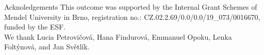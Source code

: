 \documentclass[final]{beamer}
\newlength{\sepwidth}
\newlength{\colwidth}
\newcommand{\separatorcolumn}{\begin{column}{\sepwidth}\end{column}}
\begin{document}
\begin{frame}[t]
\begin{columns}[t]
\begin{column}{\colwidth}
\end{column}
\end{columns}

\begin{columns}[c]
\begin{column}{0.96\paperwidth}

\begin{block}{Acknoledgements}
\small \centering
    This outcome was supported by the Internal Grant Schemes of Mendel University in Brno, registration no.: CZ.02.2.69/0.0/0.0/19\_073/0016670, funded by the ESF. \\
    We thank Lucia Petrovičová, Hana Findurová, Emmanuel Opoku, Lenka Foltýnová, and Jan Světlík.
\end{block}

\end{column}
%
%
\end{columns}
\end{frame}
\end{document}
